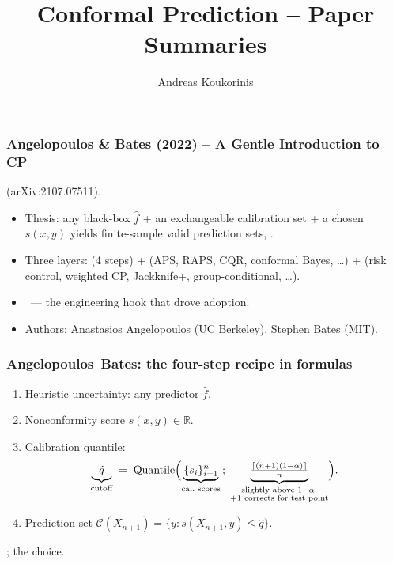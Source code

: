\documentclass[11pt, aspectratio=169, xcolor={dvipsnames}, usepdftitle=false]{beamer}
\title{Conformal Prediction -- Paper Summaries}
\author{Andreas Koukorinis}
\date{}
\begin{document}
\begin{frame}
\frametitle{Angelopoulos \& Bates (2022) -- A Gentle Introduction to CP}
 (arXiv:2107.07511). 
\begin{itemize}
\item Thesis: any black-box $\hat{f}$ + an exchangeable calibration set + a chosen  $s(x,y)$ yields finite-sample valid prediction sets, .
\item Three layers:  (4 steps) \quad+\quad {} (APS, RAPS, CQR, conformal Bayes, \ldots) \quad+\quad {} (risk control, weighted CP, Jackknife+, group-conditional, \ldots).
\item {}~--- the engineering hook that drove adoption.
\item Authors: Anastasios Angelopoulos (UC Berkeley), Stephen Bates (MIT).
\end{itemize}
\end{frame}

\begin{frame}
\frametitle{Angelopoulos--Bates: the four-step recipe in formulas}
\begin{enumerate}
\item Heuristic uncertainty: any predictor $\hat{f}$.
\item Nonconformity score $s(x, y) \in \mathbb{R}$.
\item Calibration quantile:
\begin{equation*}
\underbrace{\hat{q}}_{\text{cutoff}}
\;=\;
\text{Quantile}\Bigl(
\underbrace{\{s_i\}_{i=1}^n}_{\text{cal.\ scores}}
\,;\;
\underbrace{\tfrac{\lceil (n+1)(1-\alpha)\rceil}{n}}_{\substack{\text{slightly above }1-\alpha;\\\text{+1 corrects for test point}}}
\Bigr).
\end{equation*}
\item Prediction set $\mathcal{C}(X_{n+1}) = \{y : s(X_{n+1}, y) \leq \hat{q}\}$.
\end{enumerate}
; the  choice.
\end{frame}
\end{document}
